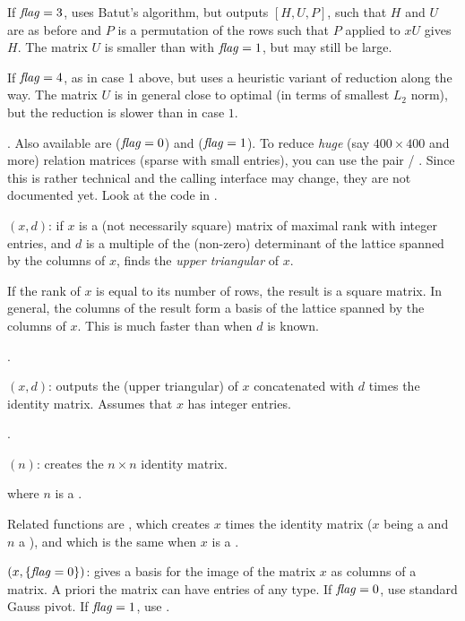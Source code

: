 If $\hbox{\it f\kern0pt lag\/}=3$, uses Batut's algorithm, but outputs $[H,U,P]$, such that $H$ and
$U$ are as before and $P$ is a permutation of the rows such that $P$ applied
to $xU$ gives $H$. The matrix $U$ is smaller than with $\hbox{\it f\kern0pt lag\/}=1$, but may still
be large.

If $\hbox{\it f\kern0pt lag\/}=4$, as in case 1 above, but uses a heuristic variant of 
reduction along the way. The matrix $U$ is in general close to optimal (in
terms of smallest $L_2$ norm), but the reduction is slower than in case $1$.

. Also available are  ($\hbox{\it f\kern0pt lag\/}=0$) and
 ($\hbox{\it f\kern0pt lag\/}=1$). To reduce \emph{huge} (say $400 \times 400$ and
more) relation matrices (sparse with small entries), you can use the pair
 / . Since this is rather technical and the
calling interface may change, they are not documented yet. Look at the code
in .

$(x,d)$: if $x$ is a (not necessarily square) matrix of
maximal rank with integer entries, and $d$ is a multiple of the (non-zero)
determinant of the lattice spanned by the columns of $x$, finds the
\emph{upper triangular}  of $x$.

If the rank of $x$ is equal to its number of rows, the result is a square
matrix. In general, the columns of the result form a basis of the lattice
spanned by the columns of $x$. This is much faster than  when $d$
is known.

.

$(x,d)$: outputs the (upper triangular)
 of $x$ concatenated with $d$ times
the identity matrix. Assumes that $x$ has integer entries.

.

$(n)$: creates the $n\times n$ identity matrix.

 where $n$ is a .

Related functions are , which creates $x$ times the
identity matrix ($x$ being a  and $n$ a ), and
 which is the same when $x$ is a .

$(x,\{\hbox{\it f\kern0pt lag\/}=0\})$: gives a basis for the image of the
matrix $x$ as columns of a matrix. A priori the matrix can have entries of
any type. If $\hbox{\it f\kern0pt lag\/}=0$, use standard Gauss pivot. If $\hbox{\it f\kern0pt lag\/}=1$, use
.

